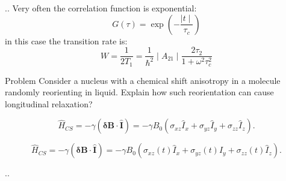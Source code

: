 \documentclass[handout]{beamer}
\begin{document}
\begin{frame}{\thesection.\thesubsection. \insertsubsection}
    Very often the correlation function is exponential:
    \begin{equation}
       G(\tau) = \exp (-\dfrac{\mid t \mid}{\tau_c})
    \end{equation}
    in this case the transition rate is:
    \begin{equation}
      W = \dfrac{1}{2 T_1}= \dfrac{1}{\hbar^2} \mid A_{21} \mid \dfrac{2 \tau_2 }{1 + \omega^2 \tau_c^2}
    \end{equation}
    
    
        \begin{block}{Problem}
        	Consider a nucleus with a chemical shift anisotropy in a molecule  randomly reorienting in liquid. Explain how such reorientation can cause longitudinal relaxation?
       	\end{block}
        \begin{equation}
            \hat{H}_{CS} = - \gamma (\bm{\delta B} \cdot \bm{\hat{I}}) = -\gamma B_0 ( \sigma_{xz} \hat{I}_x + \sigma_{yz} \hat{I}_y + \sigma_{zz} \hat{I}_z )  .
        \end{equation}
       	
       	\begin{equation}
       	\hat{H}_{CS} = - \gamma (\bm{\delta B} \cdot \bm{\hat{I}}) = -\gamma B_0 ( \sigma_{xz}(t) \hat{I}_x + \sigma_{yz}(t) \hat{I}_y + \sigma_{zz}(t) \hat{I}_z )  .
       	\end{equation}
       	
       	
\end{frame}


\begin{frame}{\thesection.\thesubsection. \insertsubsection}

\end{frame}
\end{document}
